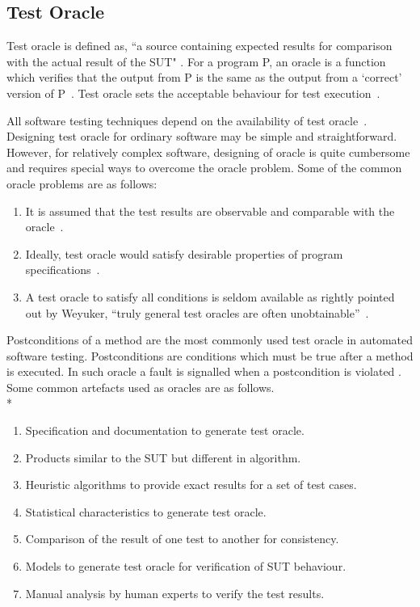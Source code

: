 \subsection{Test Oracle}
Test oracle is defined as, ``a source containing expected results for comparison with the actual result of the SUT" \cite{ahmed2010software}. For a program P, an oracle is a function which verifies that the output from P is the same as the output from a ‘correct’ version of P~\cite{howden1986functional}. Test oracle sets the acceptable behaviour for test execution~\cite{baresi2001test}. 

All software testing techniques depend on the availability of test oracle~\cite{gaudel2010software}. Designing test oracle for ordinary software may be simple and straightforward. However, for relatively complex software, designing of oracle is quite cumbersome and requires special ways to overcome the oracle problem. Some of the common oracle problems are as follows:

\begin{enumerate}
\item It is assumed that the test results are observable and comparable with the oracle~\cite{weyuker1982testing}.
\item Ideally, test oracle would satisfy desirable properties of program specifications~\cite{baresi2001test}.
\item A test oracle to satisfy all conditions is seldom available as rightly pointed out by Weyuker, ``truly general test oracles are often unobtainable''~\cite{weyuker1982testing}. 
\end{enumerate}
\bigskip
Postconditions of a method are the most commonly used test oracle in automated software testing. Postconditions are conditions which must be true after a method is executed. In such oracle a fault is signalled when a postcondition is violated \cite{meyer2009programs}. Some common artefacts used as oracles are as follows.\\*
\begin{enumerate}
\item Specification and documentation to generate test oracle. 
\item Products similar to the SUT but different in algorithm. %
\item Heuristic algorithms to provide exact results for a set of test cases. %
\item Statistical characteristics to generate test oracle. %
\item Comparison of the result of one test to another for consistency. %
\item Models to generate test oracle for verification of SUT behaviour. %
\item Manual analysis by human experts to verify the test results. %
\end{enumerate}

